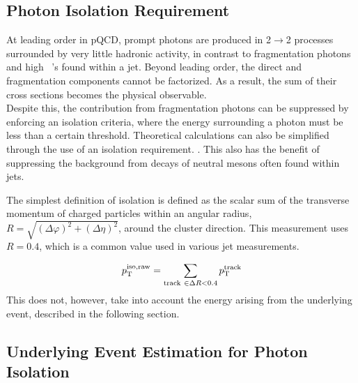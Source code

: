 \subsection{Photon Isolation Requirement}
\label{sec:isolation}
At leading order in pQCD, prompt photons are produced in 2$\to$2 processes surrounded by very little hadronic activity, in contrast to fragmentation photons and high \pt~\pizero's found within a jet. Beyond leading order, the direct and fragmentation components cannot be factorized. As a result, the sum of their cross sections becomes the physical observable.\\

Despite this, the contribution from fragmentation photons can be suppressed by enforcing an isolation criteria, where the energy surrounding a photon must be less than a certain threshold. 
Theoretical calculations can also be simplified through the use of an isolation requirement. \cite{PhysRevD.82.014015}. This also has the benefit of suppressing the background from decays of neutral mesons often found within jets.

The simplest definition of isolation is defined as the scalar sum of the transverse momentum of charged particles within an angular radius, $R =\sqrt{(\Delta\varphi)^{2} +(\Delta\eta)^{2}  }$, around the cluster direction. This measurement uses $R = 0.4$, which is a common value used in various jet measurements.

\begin{equation}
p_{\mathrm{T}}^\mathrm{iso,raw} = \sum_{\mathrm{track}~\in\Delta R<0.4} p_{\mathrm{T}}^{\mathrm{track}}	
\end{equation}
This does not, however, take into account the energy arising from the underlying event, described in the following section.


\subsection{Underlying Event Estimation for Photon Isolation}
\label{sec:ue_isolation}

